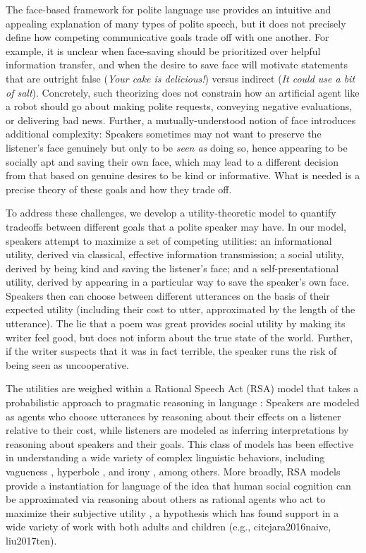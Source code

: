 \documentclass[9pt,twocolumn,twoside,lineno]{main_class_file}
\begin{document}
The face-based framework for polite language use provides an intuitive
and appealing explanation of many types of polite speech, but it does
not precisely define how competing communicative goals trade off with
one another. For example, it is unclear when face-saving should be
prioritized over helpful information transfer, and when the desire to
save face will motivate statements that are outright false
(\emph{Your cake is delicious!}) versus indirect (\emph{It could
use a bit of salt}). Concretely, such theorizing does not constrain how
an artificial agent like a robot should go about making polite requests,
conveying negative evaluations, or delivering bad news. Further, a
mutually-understood notion of face introduces additional complexity:
Speakers sometimes may not want to preserve the listener's face
genuinely but only to be \emph{seen as} doing so, hence appearing to be
socially apt and saving their own face, which may lead to a different
decision from that based on genuine desires to be kind or informative.
What is needed is a precise theory of these goals and how they trade
off.

To address these challenges, we develop a utility-theoretic model to
quantify tradeoffs between different goals that a polite speaker may
have. In our model, speakers attempt to maximize a set of competing
utilities: an informational utility, derived via classical, effective
information transmission; a social utility, derived by being kind and
saving the listener's face; and a self-presentational utility, derived
by appearing in a particular way to save the speaker's own face.
Speakers then can choose between different utterances on the basis of
their expected utility (including their cost to utter, approximated by
the length of the utterance). The lie that a poem was great provides
social utility by making its writer feel good, but does not inform about
the true state of the world. Further, if the writer suspects that it was
in fact terrible, the speaker runs the risk of being seen as
uncooperative.

The utilities are weighed within a Rational Speech Act (RSA) model that
takes a probabilistic approach to pragmatic reasoning in language \cite{frank2012, goodman2016}: Speakers are modeled as
agents who choose utterances by reasoning about their effects on a
listener relative to their cost, while listeners are modeled as
inferring interpretations by reasoning about speakers and their goals.
This class of models has been effective in understanding a wide variety
of complex linguistic behaviors, including vagueness \cite{lassiter2017adjectival}, hyperbole \cite{kao2014}, and irony
\cite{kao2015}, among others. More broadly, RSA models provide a
instantiation for language of the idea that human social cognition can
be approximated via reasoning about others as rational agents who act to
maximize their subjective utility \cite{baker2009action}, a
hypothesis which has found support in a wide variety of work with both
adults and children (e.g., cite{jara2016naive, liu2017ten}).
\end{document}
